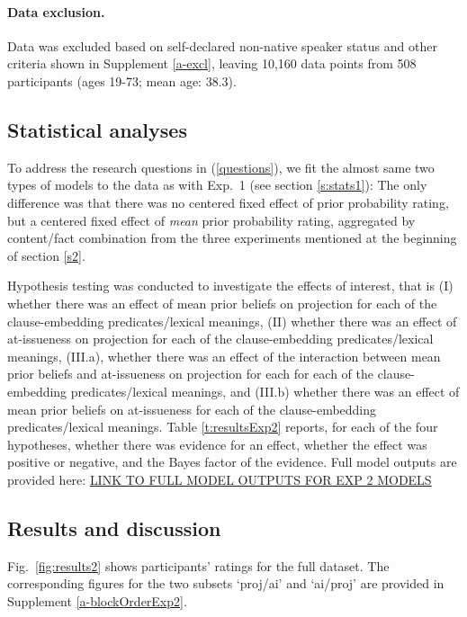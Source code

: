 \documentclass[11pt,fleqn]{article}
\newcommand{\6}{\mbox{$[\hspace*{-.6mm}[$}}
\newcommand{\9}{\mbox{$]\hspace*{-.6mm}]$}}
\begin{document}
\paragraph{Data exclusion.} Data was excluded based on self-declared non-native speaker status and other criteria shown in Supplement \ref{a-excl}, leaving 10,160 data points from 508 participants (ages 19-73; mean age: 38.3).

\subsection{Statistical analyses}

To address the research questions in (\ref{questions}), we fit the almost same two types of models to the data as with Exp.~1 (see section \ref{s:stats1}): The only difference was that there was no centered fixed effect of prior probability rating, but a centered fixed effect of {\em mean} prior probability rating, aggregated by content/fact combination from the three experiments mentioned at the beginning of section \ref{s2}.

Hypothesis testing was conducted to investigate the effects of interest, that is (I) whether there was an effect of mean prior beliefs on projection for each of the clause-embedding predicates/lexical meanings, (II) whether there was an effect of at-issueness on projection for each of the clause-embedding predicates/lexical meanings, (III.a), whether there was an effect of the interaction between mean prior beliefs and at-issueness on projection for each  for each of the clause-embedding predicates/lexical meanings, and (III.b) whether there was an effect of mean prior beliefs on at-issueness for each of the clause-embedding predicates/lexical meanings. Table \ref{t:resultsExp2} reports, for each of the four hypotheses, whether there was evidence for an effect, whether the effect was positive or negative, and the Bayes factor of the evidence. Full model outputs are provided here: \url{LINK TO FULL MODEL OUTPUTS FOR EXP 2 MODELS}

\subsection{Results and discussion}

Fig.~\ref{fig:results2} shows participants' ratings for the full dataset. The corresponding figures for the two subsets `proj/ai' and `ai/proj' are provided in Supplement \ref{a-blockOrderExp2}.
\end{document}
